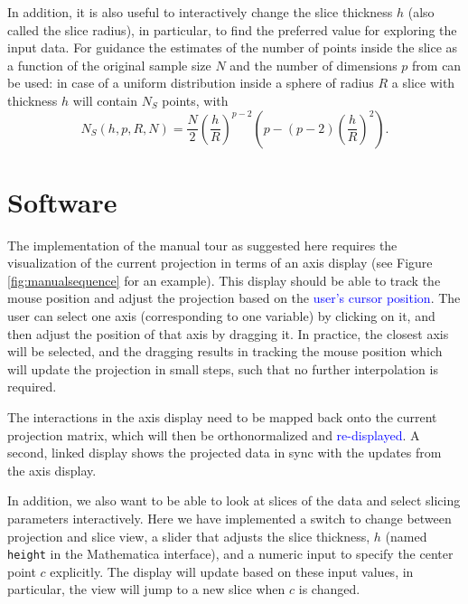 \documentclass[]{interact}
\theoremstyle{plain}%
\theoremstyle{definition}
\theoremstyle{remark}
\begin{document}
In addition, it is also useful to interactively change the slice
thickness \(h\) (also called the slice radius), in particular, to find
the preferred value for exploring the input data. For guidance the
estimates of the number of points inside the slice as a function of the
original sample size \(N\) and the number of dimensions \(p\) from
\citet{sectionpursuit} can be used: in case of a uniform distribution
inside a sphere of radius \(R\) a slice with thickness \(h\) will
contain \(N_S\) points, with \begin{equation}
N_S(h, p, R, N) = \frac{N}{2} \left(\frac{h}{R}\right)^{p-2} \left(p - (p-2)\left(\frac{h}{R}\right)^{2}\right).
\label{eq:count}
\end{equation}

\hypertarget{sec:implementation}{%
\section{Software}\label{sec:implementation}}

The implementation of the manual tour as suggested here requires the
visualization of the current projection in terms of an axis display (see
Figure \ref{fig:manualsequence} for an example). This display should be
able to track the mouse position and adjust the projection based on the
\textcolor{blue}{user's cursor position}. The user can select one axis
(corresponding to one variable) by clicking on it, and then adjust the
position of that axis by dragging it. In practice, the closest axis will
be selected, and the dragging results in tracking the mouse position
which will update the projection in small steps, such that no further
interpolation is required.

The interactions in the axis display need to be mapped back onto the
current projection matrix, which will then be orthonormalized and
\textcolor{blue}{re-displayed}. A second, linked display shows the
projected data in sync with the updates from the axis display.

In addition, we also want to be able to look at slices of the data and
select slicing parameters interactively. Here we have implemented a
switch to change between projection and slice view, a slider that
adjusts the slice thickness, \(h\) (named \texttt{height} in the
Mathematica interface), and a numeric input to specify the center point
\(c\) explicitly. The display will update based on these input values,
in particular, the view will jump to a new slice when \(c\) is changed.
\end{document}
